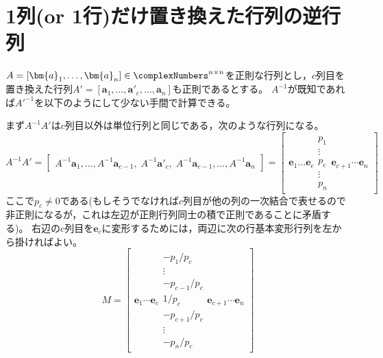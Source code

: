     \section{1列(or 1行)だけ置き換えた行列の逆行列}
        $A=[\bm{a}_1,\dotsc,\bm{a}_n]\in\complexNumbers^{n\times n}$を正則な行列とし，$c$列目を置き換えた行列$A'=[\bm{a}_1,\dotsc,\bm{a}'_c,\dotsc,\bm{a}_n]$も正則であるとする。
        $A^{-1}$が既知であれば$A'^{-1}$を以下のようにして少ない手間で計算できる。
        \par
        まず$A^{-1}A'$は$c$列目以外は単位行列と同じである，次のような行列になる。
        \[
            A^{-1}A' =
            \begin{bmatrix}
                A^{-1}\bm{a}_1, \dotsc, A^{-1}\bm{a}_{c-1},\; A^{-1}\bm{a}'_c,\; A^{-1}\bm{a}_{c-1}, \dotsc, A^{-1}\bm{a}_n
            \end{bmatrix}
            =
            \begin{bmatrix}
                \bm{e}_1\dotsc\bm{e}_c
                \begin{matrix}
                    p_1 \\
                    \vdots \\
                    p_c \\
                    \vdots \\
                    p_n
                \end{matrix}
                \bm{e}_{c+1}\cdots\bm{e}_n
            \end{bmatrix}
        \]
        ここで$p_c\neq 0$である(もしそうでなければ$c$列目が他の列の一次結合で表せるので非正則になるが，これは左辺が正則行列同士の積で正則であることに矛盾する)。
        右辺の$c$列目を$\bm{e}_c$に変形するためには，両辺に次の行基本変形行列を左から掛ければよい。
        \[
            M =
            \begin{bmatrix}
                \bm{e}_1\cdots\bm{e}_c
                \begin{matrix}
                    -p_1/p_c \\
                    \vdots \\
                    -p_{c-1}/p_c \\
                    1/p_c \\
                    -p_{c+1}/p_c \\
                    \vdots \\
                    -p_n/p_c
                \end{matrix}
                \bm{e}_{c+1}\cdots\bm{e}_n
            \end{bmatrix}
        \]
